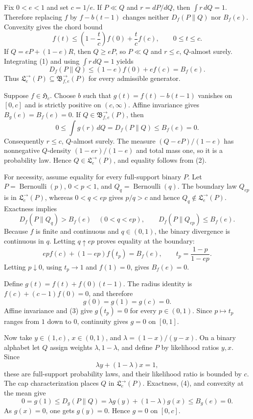 Fix \(0<e<1\) and set \(c=1/e\).  If \(P\ll Q\) and \(r=dP/dQ\), then \(\int r\,dQ=1\).  Therefore replacing \(f\) by \(f-b(t-1)\) changes neither \(D_f(P\|Q)\) nor \(B_f(e)\).  Convexity gives the chord bound
\[
 f(t)\le \left(1-\frac{t}{c}\right)f(0)+\frac{t}{c}f(c),\qquad 0\le t\le c. \tag{1}
\]
If \(Q=eP+(1-e)R\), then \(Q\ge eP\), so \(P\ll Q\) and \(r\le c\), \(Q\)-almost surely.  Integrating (1) and using \(\int r\,dQ=1\) yields
\[
 D_f(P\|Q)\le (1-e)f(0)+ef(c)=B_f(e). \tag{2}
\]
Thus \(\mathfrak L^{\to}_e(P)\subseteq\mathfrak B^{\to}_{f,e}(P)\) for every admissible generator.

Suppose \(f\in\mathfrak H_c\).  Choose \(b\) such that \(g(t)=f(t)-b(t-1)\) vanishes on \([0,c]\) and is strictly positive on \((c,\infty)\).  Affine invariance gives \(B_g(e)=B_f(e)=0\).  If \(Q\in\mathfrak B^{\to}_{f,e}(P)\), then
\[
 0\le\int g(r)\,dQ=D_f(P\|Q)\le B_f(e)=0.
\]
Consequently \(r\le c\), \(Q\)-almost surely.  The measure \((Q-eP)/(1-e)\) has nonnegative \(Q\)-density \((1-er)/(1-e)\) and total mass one, so it is a probability law.  Hence \(Q\in\mathfrak L^{\to}_e(P)\), and equality follows from (2).

For necessity, assume equality for every full-support binary \(P\).  Let \(P=\operatorname{Bernoulli}(p)\), \(0<p<1\), and \(Q_q=\operatorname{Bernoulli}(q)\).  The boundary law \(Q_{ep}\) is in \(\mathfrak L^{\to}_e(P)\), whereas \(0<q<ep\) gives \(p/q>c\) and hence \(Q_q\notin\mathfrak L^{\to}_e(P)\).  Exactness implies
\[
 D_f(P\|Q_q)>B_f(e)\quad(0<q<ep),
 \qquad D_f(P\|Q_{ep})\le B_f(e).
\]
Because \(f\) is finite and continuous and \(q\in(0,1)\), the binary divergence is continuous in \(q\).  Letting \(q\uparrow ep\) proves equality at the boundary:
\[
 ep f(c)+(1-ep)f(t_p)=B_f(e),
 \qquad t_p=\frac{1-p}{1-ep}. \tag{3}
\]
Letting \(p\downarrow0\), using \(t_p\to1\) and \(f(1)=0\), gives \(B_f(e)=0\).

Define \(g(t)=f(t)+f(0)(t-1)\).  The radius identity is \(f(c)+(c-1)f(0)=0\), and therefore
\[
 g(0)=g(1)=g(c)=0. \tag{4}
\]
Affine invariance and (3) give \(g(t_p)=0\) for every \(p\in(0,1)\).  Since \(p\mapsto t_p\) ranges from \(1\) down to \(0\), continuity gives \(g=0\) on \([0,1]\).

Now take \(y\in(1,c)\), \(x\in(0,1)\), and \(\lambda=(1-x)/(y-x)\).  On a binary alphabet let \(Q\) assign weights \(\lambda,1-\lambda\), and define \(P\) by likelihood ratios \(y,x\).  Since
\[
 \lambda y+(1-\lambda)x=1,
\]
these are full-support probability laws, and their likelihood ratio is bounded by \(c\).  The cap characterization places \(Q\) in \(\mathfrak L^{\to}_e(P)\).  Exactness, (4), and convexity at the mean give
\[
 0=g(1)\le D_g(P\|Q)=\lambda g(y)+(1-\lambda)g(x)\le B_g(e)=0.
\]
As \(g(x)=0\), one gets \(g(y)=0\).  Hence \(g=0\) on \([0,c]\).


